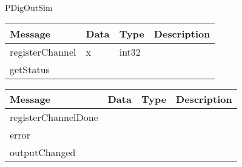  {PDigOutSim}

\begin{tabular}[ht]{|l|l|l|p{8cm}|}
\hline
Message & Data & Type & Description\\
\hline
registerChannel &  x  &  int32  & \\
\hline
getStatus &  &  & \\
\hline
\end{tabular}
\begin{tabular}[ht]{|l|l|l|p{8cm}|}
\hline
Message & Data & Type & Description\\
\hline
registerChannelDone &  &  & \\
\hline
error &  &  & \\
\hline
outputChanged &  &  & \\
\hline
\end{tabular}
